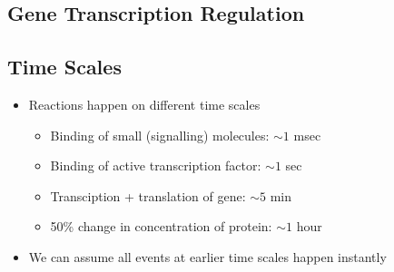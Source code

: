 
\begin{slide}
\section[-2]{Gene Transcription Regulation}
\pause
\pb {}
\begin{center}
  \pause
\end{center}

\end{slide}


\begin{slide}
\section{Time Scales}

\begin{PauseHighLight}
  \begin{itemize}
  \item Reactions happen on different time scales
    \begin{itemize}
    \item Binding of small (signalling) molecules: \hfill $\sim1$ msec\quad\pause
    \item Binding of active transcription factor: \hfill $\sim1$ sec\quad\pause
    \item Transciption + translation of gene: \hfill $\sim5$ min\quad\pause
    \item 50\% change in concentration of protein: \hfill $\sim1$ hour\quad\pause
    \end{itemize}
  \item We can assume all events at earlier time scales happen instantly\pause
  \end{itemize}
\end{PauseHighLight}


\end{slide}

\Outline %

\newcommand{\RNA}{\mathit{RNA}}

